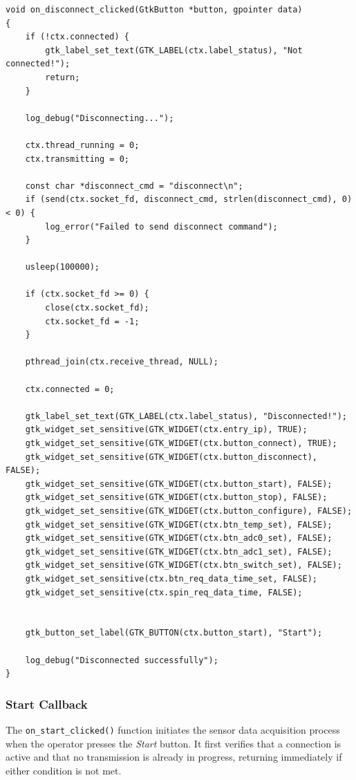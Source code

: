 \begin{verbatim}
void on_disconnect_clicked(GtkButton *button, gpointer data)
{
    if (!ctx.connected) {
        gtk_label_set_text(GTK_LABEL(ctx.label_status), "Not connected!");
        return;
    }

    log_debug("Disconnecting...");

    ctx.thread_running = 0;
    ctx.transmitting = 0;

    const char *disconnect_cmd = "disconnect\n";
    if (send(ctx.socket_fd, disconnect_cmd, strlen(disconnect_cmd), 0) < 0) {
        log_error("Failed to send disconnect command");
    }

    usleep(100000);

    if (ctx.socket_fd >= 0) {
        close(ctx.socket_fd);
        ctx.socket_fd = -1;
    }

    pthread_join(ctx.receive_thread, NULL);

    ctx.connected = 0;

    gtk_label_set_text(GTK_LABEL(ctx.label_status), "Disconnected!");
    gtk_widget_set_sensitive(GTK_WIDGET(ctx.entry_ip), TRUE);
    gtk_widget_set_sensitive(GTK_WIDGET(ctx.button_connect), TRUE);
    gtk_widget_set_sensitive(GTK_WIDGET(ctx.button_disconnect), FALSE);
    gtk_widget_set_sensitive(GTK_WIDGET(ctx.button_start), FALSE);
    gtk_widget_set_sensitive(GTK_WIDGET(ctx.button_stop), FALSE);
    gtk_widget_set_sensitive(GTK_WIDGET(ctx.button_configure), FALSE);
    gtk_widget_set_sensitive(GTK_WIDGET(ctx.btn_temp_set), FALSE);
    gtk_widget_set_sensitive(GTK_WIDGET(ctx.btn_adc0_set), FALSE);
    gtk_widget_set_sensitive(GTK_WIDGET(ctx.btn_adc1_set), FALSE);
    gtk_widget_set_sensitive(GTK_WIDGET(ctx.btn_switch_set), FALSE);
    gtk_widget_set_sensitive(ctx.btn_req_data_time_set, FALSE);
    gtk_widget_set_sensitive(ctx.spin_req_data_time, FALSE);


    gtk_button_set_label(GTK_BUTTON(ctx.button_start), "Start");

    log_debug("Disconnected successfully");
}
\end{verbatim}

\subsubsection{Start Callback}

The \texttt{on\_start\_clicked()} function initiates the sensor data
acquisition process when the operator presses the \textit{Start} button.
It first verifies that a connection is active and that no transmission is
already in progress, returning immediately if either condition is not met.

